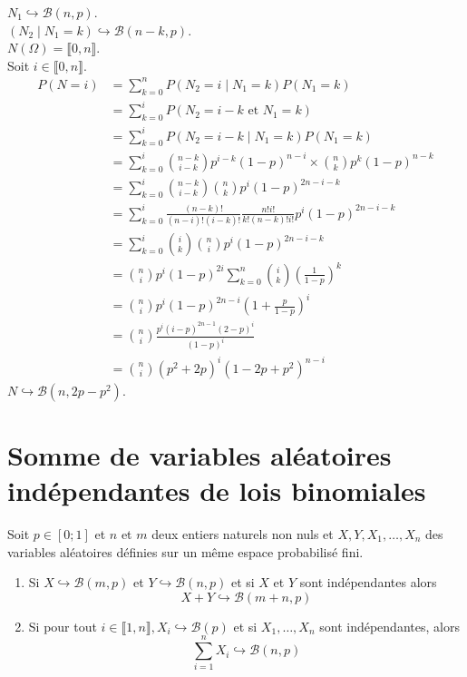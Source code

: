 \documentclass[../main.tex]{subfiles}
\begin{document}
\noindent $N_1 \hookrightarrow \mathcal{B}(n, p)$. \\
$(N_2\mid N_1 = k) \hookrightarrow \mathcal{B}(n-k, p)$. \\
$N(\Omega) = \llbracket 0, n \rrbracket$. \\
Soit $i\in \llbracket 0, n \rrbracket$.
\begin{align*}
    P(N = i) &= \sum_{k=0}^{n} P(N_2 = i \mid N_1 = k)P(N_1 = k) \\
    &= \sum_{k=0}^{i} P(N_2 = i - k \text{ et } N_1 = k) \\
    &= \sum_{k=0}^{i} P(N_2 = i - k \mid N_1 = k)P(N_1 = k) \\
    &= \sum_{k=0}^{i} \binom{n-k}{i-k} p^{i-k} (1-p)^{n-i} \times \binom{n}{k} p^k (1-p)^{n-k} \\
    &= \sum_{k=0}^{i} \binom{n-k}{i-k} \binom{n}{k} p^i (1-p)^{2n-i-k} \\
    &= \sum_{k=0}^{i} \frac{(n-k)!}{(n-i)!(i-k)!} \frac{n!i!}{k!(n-k)!i!} p^i (1-p)^{2n-i-k} \\
    &= \sum_{k=0}^{i} \binom{i}{k}\binom{n}{i} p^i (1-p)^{2n-i-k} \\
    &= \binom{n}{i} p^i (1-p)^{2i} \sum_{k=0}^{n} \binom{i}{k} \left(\frac{1}{1-p}\right)^k \\
    &= \binom{n}{i} p^i (1-p)^{2n-i} \left(1 + \frac{p}{1-p}\right)^i \\
    &= \binom{n}{i} \frac{p^i (i-p)^{2n-1}(2-p)^i}{(1-p)^{i}} \\
    &= \binom{n}{i} (p^2 + 2p)^i (1 - 2p + p^2)^{n-i}
\end{align*}
$N\hookrightarrow \mathcal{B}(n, 2p-p^2)$.

\section{Somme de variables aléatoires indépendantes de lois binomiales}
\begin{tcolorbox}[title=Théorème 32.68, title filled=false, colframe=orange, colback=orange!10!white]
    Soit $p \in[0 ; 1]$ et $n$ et $m$ deux entiers naturels non nuls et $X, Y, X_1, \ldots, X_n$ des variables aléatoires définies sur un même espace probabilisé fini.
    \begin{enumerate}
        \item Si $X \hookrightarrow \mathcal{B}(m, p)$ et $Y \hookrightarrow \mathcal{B}(n, p)$ et si $X$ et $Y$ sont indépendantes alors
        $$X+Y \hookrightarrow \mathcal{B}(m+n, p)$$
        \item  Si pour tout $i \in \llbracket 1, n \rrbracket, X_i \hookrightarrow \mathcal{B}(p)$ et si $X_1, \ldots, X_n$ sont indépendantes, alors
        $$\sum_{i=1}^n X_i \hookrightarrow \mathcal{B}(n, p)$$
    \end{enumerate}
\end{tcolorbox}
\end{document}

